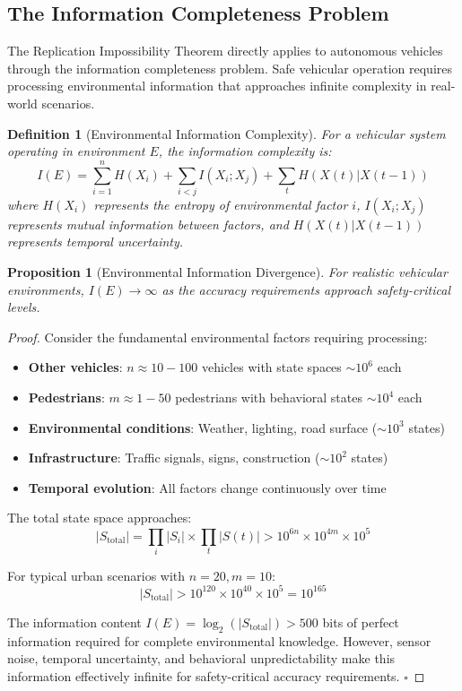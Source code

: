 \documentclass[12pt,a4paper]{article}
\newtheorem{proposition}[theorem]{Proposition}
\newtheorem{definition}[theorem]{Definition}
\begin{document}
\subsection{The Information Completeness Problem}

The Replication Impossibility Theorem directly applies to autonomous vehicles through the information completeness problem. Safe vehicular operation requires processing environmental information that approaches infinite complexity in real-world scenarios.

\begin{definition}[Environmental Information Complexity]
For a vehicular system operating in environment $E$, the information complexity is:
$$I(E) = \sum_{i=1}^{n} H(X_i) + \sum_{i<j} I(X_i; X_j) + \sum_{t} H(X(t)|X(t-1))$$
where $H(X_i)$ represents the entropy of environmental factor $i$, $I(X_i; X_j)$ represents mutual information between factors, and $H(X(t)|X(t-1))$ represents temporal uncertainty.
\end{definition}

\begin{proposition}[Environmental Information Divergence]
For realistic vehicular environments, $I(E) \rightarrow \infty$ as the accuracy requirements approach safety-critical levels.
\end{proposition}

\begin{proof}
Consider the fundamental environmental factors requiring processing:
\begin{itemize}
\item \textbf{Other vehicles}: $n \approx 10-100$ vehicles with state spaces $\sim 10^6$ each
\item \textbf{Pedestrians}: $m \approx 1-50$ pedestrians with behavioral states $\sim 10^4$ each  
\item \textbf{Environmental conditions}: Weather, lighting, road surface ($\sim 10^3$ states)
\item \textbf{Infrastructure}: Traffic signals, signs, construction ($\sim 10^2$ states)
\item \textbf{Temporal evolution}: All factors change continuously over time
\end{itemize}

The total state space approaches:
$$|S_{\text{total}}| = \prod_{i} |S_i| \times \prod_{t} |S(t)| > 10^{6n} \times 10^{4m} \times 10^5$$

For typical urban scenarios with $n=20, m=10$:
$$|S_{\text{total}}| > 10^{120} \times 10^{40} \times 10^5 = 10^{165}$$

The information content $I(E) = \log_2(|S_{\text{total}}|) > 500$ bits of perfect information required for complete environmental knowledge. However, sensor noise, temporal uncertainty, and behavioral unpredictability make this information effectively infinite for safety-critical accuracy requirements. $\square$
\end{proof}
\end{document}
